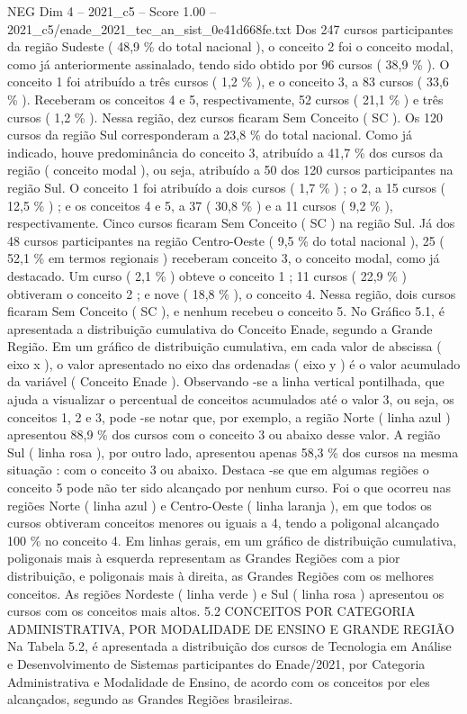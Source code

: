 \begin{textsample}{NEG Dim 4 – 2021\_c5 – Score 1.00 – 2021\_c5/enade\_2021\_tec\_an\_sist\_0e41d668fe.txt}
Dos 247 cursos participantes da região Sudeste ( 48,9 \% do total nacional ), o conceito 2 foi o conceito modal, como já anteriormente assinalado, tendo sido obtido por 96 cursos ( 38,9 \% ).
O conceito 1 foi atribuído a três cursos ( 1,2 \% ), e o conceito 3, a 83 cursos ( 33,6 \% ).
Receberam os conceitos 4 e 5, respectivamente, 52 cursos ( 21,1 \% ) e três cursos ( 1,2 \% ).
Nessa região, dez cursos ficaram Sem Conceito ( SC ).
Os 120 cursos da região Sul corresponderam a 23,8 \% do total nacional.
Como já indicado, houve predominância do conceito 3, atribuído a 41,7 \% dos cursos da região ( conceito modal ), ou seja, atribuído a 50 dos 120 cursos participantes na região Sul.
O conceito 1 foi atribuído a dois cursos ( 1,7 \% ) ; o 2, a 15 cursos ( 12,5 \% ) ; e os conceitos 4 e 5, a 37 ( 30,8 \% ) e a 11 cursos ( 9,2 \% ), respectivamente.
Cinco cursos ficaram Sem Conceito ( SC ) na região Sul.
Já dos 48 cursos participantes na região Centro-Oeste ( 9,5 \% do total nacional ), 25 ( 52,1 \% em termos regionais ) receberam conceito 3, o conceito modal, como já destacado.
Um curso ( 2,1 \% ) obteve o conceito 1 ; 11 cursos ( 22,9 \% ) obtiveram o conceito 2 ; e nove ( 18,8 \% ), o conceito 4.
Nessa região, dois cursos ficaram Sem Conceito ( SC ), e nenhum recebeu o conceito 5.
No Gráfico 5.1, é apresentada a distribuição cumulativa do Conceito Enade, segundo a Grande Região.
Em um gráfico de distribuição cumulativa, em cada valor de abscissa ( eixo x ), o valor apresentado no eixo das ordenadas ( eixo y ) é o valor acumulado da variável ( Conceito Enade ).
Observando -se a linha vertical pontilhada, que ajuda a visualizar o percentual de conceitos acumulados até o valor 3, ou seja, os conceitos 1, 2 e 3, pode -se notar que, por exemplo, a região Norte ( linha azul ) apresentou 88,9 \% dos cursos com o conceito 3 ou abaixo desse valor.
A região Sul ( linha rosa ), por outro lado, apresentou apenas 58,3 \% dos cursos na mesma situação : com o conceito 3 ou abaixo.
Destaca -se que em algumas regiões o conceito 5 pode não ter sido alcançado por nenhum curso.
Foi o que ocorreu nas regiões Norte ( linha azul ) e Centro-Oeste ( linha laranja ), em que todos os cursos obtiveram conceitos menores ou iguais a 4, tendo a poligonal alcançado 100 \% no conceito 4.
Em linhas gerais, em um gráfico de distribuição cumulativa, poligonais mais à esquerda representam as Grandes Regiões com a pior distribuição, e poligonais mais à direita, as Grandes Regiões com os melhores conceitos.
As regiões Nordeste ( linha verde ) e Sul ( linha rosa ) apresentou os cursos com os conceitos mais altos. 5.2 CONCEITOS POR CATEGORIA ADMINISTRATIVA, POR MODALIDADE DE ENSINO E GRANDE REGIÃO Na Tabela 5.2, é apresentada a distribuição dos cursos de Tecnologia em Análise e Desenvolvimento de Sistemas participantes do Enade/2021, por Categoria Administrativa e Modalidade de Ensino, de acordo com os conceitos por eles alcançados, segundo as Grandes Regiões brasileiras.

\end{textsample}
